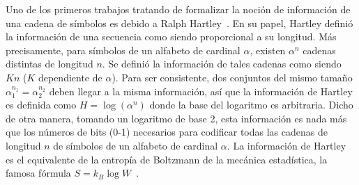 \label{Sec:SZ:Entropia}


\label{Ssec:SZ:DefinicionShannon}

Uno de los primeros trabajos tratando de formalizar la noci\'on de informaci\'on
de  una cadena  de s\'imbolos  es debido  a Ralph  Hartley~\cite{Har28}.   En su
papel,  Hartley  defini\'o  la   informaci\'on  de  una  secuencia  como  siendo
proporcional a su longitud.  M\'as  precisamente, para s\'imbolos de un alfabeto
de cardinal $\alpha$,  existen $\alpha^n$ cadenas distintas de  longitud $n$. Se
defini\'o la informaci\'on  de tales cadenas como siendo  $K n$ ($K$ dependiente
de  $\alpha$).    Para  ser  consistente,  dos  conjuntos   del  mismo  tama\~no
$\alpha_1^{n_1} =  \alpha_2^{n_2}$ deben llegar a la  misma informaci\'on, as\'i
que  la informaci\'on  de  Hartley es  definida  como $H  = \log\left(  \alpha^n
\right)$  donde la  base del  logaritmo es  arbitraria.  Dicho  de  otra manera,
tomando  un logaritmo  de  base 2,  esta  informaci\'on es  nada  m\'as que  los
n\'umeros de bits (0-1) necesarios  para codificar todas las cadenas de longitud
$n$  de s\'imbolos de  un alfabeto  de cardinal  $\alpha$.  La  informaci\'on de
Hartley  es  el equivalente  de  la entrop\'ia  de  Boltzmann  de la  mec\'anica
estad\'istica, la famosa  f\'ormula $S = k_B \log  W$~\cite{Bol96, Bol98, Jay65,
  Mer10, Mer18}.

